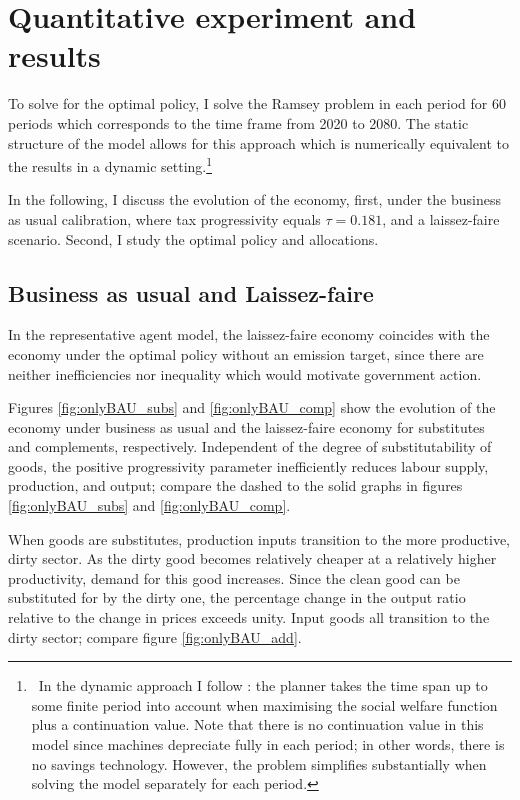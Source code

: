 \section{Quantitative experiment and results}\label{sec:simul}

To solve for the optimal policy, I solve the Ramsey problem in each period for 60 periods which corresponds to the time frame from 2020 to 2080. The static structure of the model allows for this approach which is numerically equivalent to the results in a dynamic setting.\footnote{\ In the dynamic approach I follow \cite{Jones1993OptimalGrowth}: the planner takes the time span up to some finite period into account when maximising the social welfare function plus a continuation value. Note that there is no continuation value in this model since machines depreciate fully in each period; in other words, there is no savings technology. However, the problem simplifies substantially when solving the model separately for each period. }

In the following, I discuss the evolution of the economy, first, under the business as usual calibration, where tax progressivity equals $\tau =0.181$, and a laissez-faire scenario. Second, I study the optimal policy and allocations.



\subsection{Business as usual and Laissez-faire}
In the representative agent model, the laissez-faire economy coincides with the economy under the optimal policy without an emission target, since there are neither inefficiencies nor inequality which would motivate government action. 

Figures \ref{fig:onlyBAU_subs} and \ref{fig:onlyBAU_comp} show the evolution of the economy under business as usual and the laissez-faire economy for substitutes and complements, respectively.
Independent of the degree of substitutability of goods, the positive progressivity parameter inefficiently reduces labour supply, production, and output; compare the dashed to the solid graphs in  figures \ref{fig:onlyBAU_subs} and \ref{fig:onlyBAU_comp}.

When goods are substitutes, production inputs transition to the more productive, dirty sector. As the dirty good becomes relatively cheaper at a relatively higher productivity, demand for this good increases. Since the clean good can be substituted for by the dirty one, the percentage change in the output ratio relative to the change in prices exceeds unity. Input goods all transition to the dirty sector; compare figure \ref{fig:onlyBAU_add}. 

